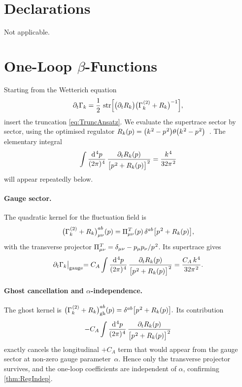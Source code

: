 \documentclass[pdflatex,sn-mathphys-num]{sn-jnl}
\theoremstyle{thmstyleone}
\theoremstyle{thmstyletwo}%
\theoremstyle{thmstylethree}%
\newcommand{\str}{\operatorname{str}}
\newcommand{\sm}{\hspace{.065em}}
\newcommand{\smexp}[1]{^{\sm #1}}
\newcommand{\dv}[1]{\mathrm{d}\smexp{#1}}
\begin{document}
\section*{Declarations}

Not applicable.

\appendix

\section{One-Loop \texorpdfstring{$\beta$}{Beta}-Functions}\label{app:OneLoopCalc}

Starting from the Wetterich equation  
\[
  \partial_{t}\Gamma_{k}
  =\frac12\,
    \str
    \Bigl[
      \bigl(\partial_{t}R_{k}\bigr)
      \bigl(\Gamma\smexp{(2)}_{k}+R_{k}\bigr)^{-1}
    \Bigr],
\]
insert the truncation \eqref{eq:TruncAnsatz}.  We evaluate the supertrace
sector by sector, using the optimised regulator  
\(R_{k}(p)=\bigl(k\smexp{2}-p\smexp{2}\bigr)\theta\bigl(k\smexp{2}-p\smexp{2}\bigr)\,\)  
\cite{Litim:2001fd}.  The elementary integral  
\[
  \int\frac{\dv{4}p}{(2\pi)\smexp{4}}\,
      \frac{\partial_{t}R_{k}(p)}
           {\bigl[p\smexp{2}+R_{k}(p)\bigr]\smexp{2}}
  =\frac{k\smexp{4}}{32\pi\smexp{2}}
\]
will appear repeatedly below.

\paragraph{Gauge sector.}
The quadratic kernel for the fluctuation field is  
\[
  \bigl(\Gamma\smexp{(2)}_{k}+R_{k}\bigr)_{\mu\nu}^{ab}(p)
  =\Pi_{\mu\nu}\smexp{T}(p)\,\delta^{ab}\bigl[p\smexp{2}+R_{k}(p)\bigr],
\]
with the transverse projector \(\Pi_{\mu\nu}\smexp{T}=\delta_{\mu\nu}-p_{\mu}p_{\nu}/p\smexp{2}\).
Its supertrace gives  
\[
  \partial_{t}\Gamma_{k}\bigl|_{\text{gauge}}
  =C_{A}
    \int\frac{\dv{4}p}{(2\pi)\smexp{4}}\,
      \frac{\partial_{t}R_{k}(p)}
           {\bigl[p\smexp{2}+R_{k}(p)\bigr]\smexp{2}}
  =\frac{C_{A}\,k\smexp{4}}{32\pi\smexp{2}}.
\]

\paragraph{Ghost cancellation and \texorpdfstring{$\alpha$}{alpha}-independence.}
The ghost kernel is  
\(
  \bigl(\Gamma\smexp{(2)}_{k}+R_{k}\bigr)^{ab}_{\mathrm{gh}}(p)
  =\delta^{ab}\bigl[p\smexp{2}+R_{k}(p)\bigr].
\)
Its contribution  
\[
  -C_{A}
    \int\frac{\dv{4}p}{(2\pi)\smexp{4}}\,
      \frac{\partial_{t}R_{k}(p)}
           {\bigl[p\smexp{2}+R_{k}(p)\bigr]\smexp{2}}
\]
exactly cancels the longitudinal \(+C_{A}\) term that would appear from the gauge
sector at non-zero gauge parameter~\(\alpha\).  
Hence only the transverse projector survives, and the one-loop coefficients are
independent of \(\alpha\), confirming \autoref{thm:RegIndep}.
\end{document}
